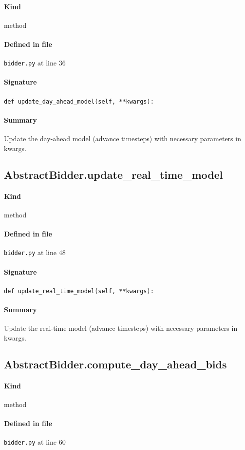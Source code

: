 \documentclass[11pt]{report}
\begin{document}
\paragraph{Kind} method
\paragraph{Defined in file} \texttt{bidder.py} at line 36
\paragraph{Signature} \texttt{def update\_day\_ahead\_model(self, **kwargs):}
\paragraph{Summary} Update the day-ahead model (advance timesteps) with necessary parameters in kwargs.
\subsection{AbstractBidder.update\_real\_time\_model}
\label{def:bidder.py:AbstractBidder.update_real_time_model:L48}
\paragraph{Kind} method
\paragraph{Defined in file} \texttt{bidder.py} at line 48
\paragraph{Signature} \texttt{def update\_real\_time\_model(self, **kwargs):}
\paragraph{Summary} Update the real-time model (advance timesteps) with necessary parameters in kwargs.
\subsection{AbstractBidder.compute\_day\_ahead\_bids}
\label{def:bidder.py:AbstractBidder.compute_day_ahead_bids:L60}
\paragraph{Kind} method
\paragraph{Defined in file} \texttt{bidder.py} at line 60
\end{document}
